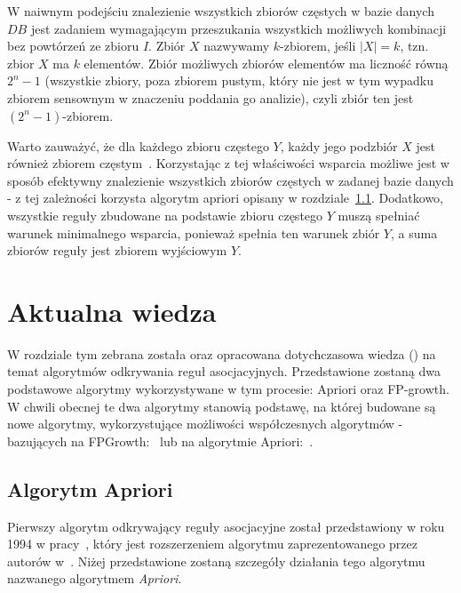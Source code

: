 W naiwnym podejściu znalezienie wszystkich zbiorów częstych w bazie danych $DB$ jest zadaniem wymagającym przeszukania wszystkich możliwych kombinacji bez powtórzeń ze zbioru $I$. Zbiór $X$ nazwywamy $k$-zbiorem, jeśli $|X|=k$, tzn. zbior $X$ ma $k$ elementów. Zbiór możliwych zbiorów elementów ma liczność równą $2^n - 1$ (wszystkie zbiory, poza zbiorem pustym, który nie jest w tym wypadku zbiorem sensownym w znaczeniu poddania go analizie), czyli zbiór ten jest $(2^n - 1)$-zbiorem.

Warto zauważyć, że dla każdego zbioru częstego $Y$, każdy jego podzbiór $X$ jest również zbiorem częstym~\cite{Problem:Statement}. Korzystając z tej właściwości wsparcia możliwe jest w sposób efektywny znalezienie wszystkich zbiorów częstych w zadanej bazie danych - z tej zależności korzysta algorytm apriori opisany w rozdziale~\ref{apriori:section}. Dodatkowo, wszystkie reguły zbudowane na podstawie zbioru częstego $Y$ muszą spełniać warunek minimalnego wsparcia, ponieważ spełnia ten warunek zbiór $Y$, a suma zbiorów reguły jest zbiorem wyjściowym $Y$.

\section{Aktualna wiedza}
W rozdziale tym zebrana została oraz opracowana dotychczasowa wiedza () na temat algorytmów odkrywania reguł asocjacyjnych. Przedstawione zostaną dwa podstawowe algorytmy wykorzystywane w tym procesie: Apriori oraz FP-growth. W chwili obecnej te dwa algorytmy stanowią podstawę, na której budowane są nowe algorytmy, wykorzystujące możliwości współczesnych algorytmów - bazujących na FPGrowth:~\cite{FP:Like_1, FP:Like_2} lub na algorytmie Apriori:~\cite{Apriori:Like_1, Apriori:Like_2}.

\subsection{Algorytm Apriori}\label{apriori:section}
Pierwszy algorytm odkrywający reguły asocjacyjne został przedstawiony w roku 1994 w pracy~\cite{Apriori:Main}, który jest rozszerzeniem algorytmu zaprezentowanego przez autorów w~\cite{Problem:Statement}. Niżej przedstawione zostaną szczegóły działania tego algorytmu nazwanego algorytmem \emph{Apriori}.

